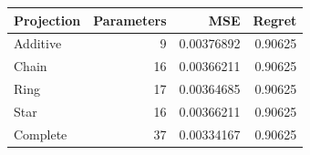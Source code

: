 \begin{tabular}{lrrr}
\toprule
Projection & Parameters & MSE & Regret \\
\midrule
Additive & 9 & 0.00376892 & 0.90625 \\
Chain & 16 & 0.00366211 & 0.90625 \\
Ring & 17 & 0.00364685 & 0.90625 \\
Star & 16 & 0.00366211 & 0.90625 \\
Complete & 37 & 0.00334167 & 0.90625 \\
\bottomrule
\end{tabular}
